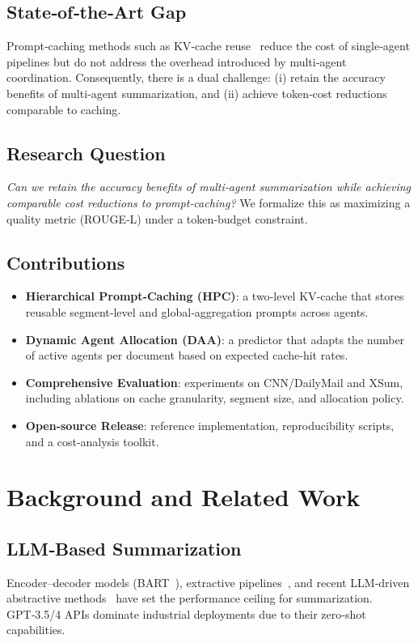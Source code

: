 \documentclass[conference]{IEEEtran}
\begin{document}
\subsection{State‑of‑the‑Art Gap}
Prompt‑caching methods such as KV‑cache reuse~\cite{promptcaching2022} reduce the cost of single‑agent pipelines but do not address the overhead introduced by multi‑agent coordination.  Consequently, there is a dual challenge: (i) retain the accuracy benefits of multi‑agent summarization, and (ii) achieve token‑cost reductions comparable to caching.

\subsection{Research Question}
\emph{Can we retain the accuracy benefits of multi‑agent summarization while achieving comparable cost reductions to prompt‑caching?}  We formalize this as maximizing a quality metric (ROUGE‑L) under a token‑budget constraint.

\subsection{Contributions}
\begin{itemize}
\item \textbf{Hierarchical Prompt‑Caching (HPC)}: a two‑level KV‑cache that stores reusable segment‑level and global‑aggregation prompts across agents.
\item \textbf{Dynamic Agent Allocation (DAA)}: a predictor that adapts the number of active agents per document based on expected cache‑hit rates.
\item \textbf{Comprehensive Evaluation}: experiments on CNN/DailyMail and XSum, including ablations on cache granularity, segment size, and allocation policy.
\item \textbf{Open‑source Release}: reference implementation, reproducibility scripts, and a cost‑analysis toolkit.
\end{itemize}

\section{Background and Related Work}
\subsection{LLM‑Based Summarization}
Encoder–decoder models (BART~\cite{lewis2020bart}), extractive pipelines~\cite{see2017get}, and recent LLM‑driven abstractive methods~\cite{gpt4summ2023} have set the performance ceiling for summarization.  GPT‑3.5/4 APIs dominate industrial deployments due to their zero‑shot capabilities.
\end{document}
